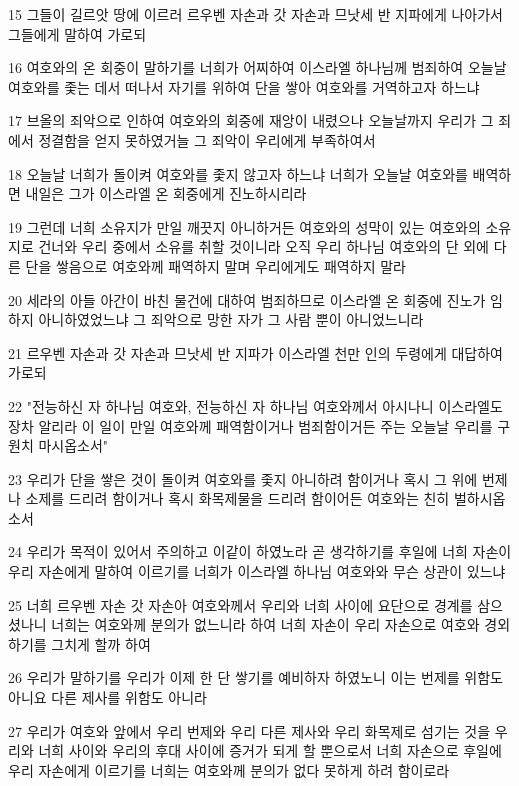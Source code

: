 \par 15 그들이 길르앗 땅에 이르러 르우벤 자손과 갓 자손과 므낫세 반 지파에게 나아가서 그들에게 말하여 가로되
\par 16 여호와의 온 회중이 말하기를 너희가 어찌하여 이스라엘 하나님께 범죄하여 오늘날 여호와를 좇는 데서 떠나서 자기를 위하여 단을 쌓아 여호와를 거역하고자 하느냐
\par 17 브올의 죄악으로 인하여 여호와의 회중에 재앙이 내렸으나 오늘날까지 우리가 그 죄에서 정결함을 얻지 못하였거늘 그 죄악이 우리에게 부족하여서
\par 18 오늘날 너희가 돌이켜 여호와를 좇지 않고자 하느냐 너희가 오늘날 여호와를 배역하면 내일은 그가 이스라엘 온 회중에게 진노하시리라
\par 19 그런데 너희 소유지가 만일 깨끗지 아니하거든 여호와의 성막이 있는 여호와의 소유지로 건너와 우리 중에서 소유를 취할 것이니라 오직 우리 하나님 여호와의 단 외에 다른 단을 쌓음으로 여호와께 패역하지 말며 우리에게도 패역하지 말라
\par 20 세라의 아들 아간이 바친 물건에 대하여 범죄하므로 이스라엘 온 회중에 진노가 임하지 아니하였었느냐 그 죄악으로 망한 자가 그 사람 뿐이 아니었느니라
\par 21 르우벤 자손과 갓 자손과 므낫세 반 지파가 이스라엘 천만 인의 두령에게 대답하여 가로되
\par 22 "전능하신 자 하나님 여호와, 전능하신 자 하나님 여호와께서 아시나니 이스라엘도 장차 알리라 이 일이 만일 여호와께 패역함이거나 범죄함이거든 주는 오늘날 우리를 구원치 마시옵소서"
\par 23 우리가 단을 쌓은 것이 돌이켜 여호와를 좇지 아니하려 함이거나 혹시 그 위에 번제나 소제를 드리려 함이거나 혹시 화목제물을 드리려 함이어든 여호와는 친히 벌하시옵소서
\par 24 우리가 목적이 있어서 주의하고 이같이 하였노라 곧 생각하기를 후일에 너희 자손이 우리 자손에게 말하여 이르기를 너희가 이스라엘 하나님 여호와와 무슨 상관이 있느냐
\par 25 너희 르우벤 자손 갓 자손아 여호와께서 우리와 너희 사이에 요단으로 경계를 삼으셨나니 너희는 여호와께 분의가 없느니라 하여 너희 자손이 우리 자손으로 여호와 경외하기를 그치게 할까 하여
\par 26 우리가 말하기를 우리가 이제 한 단 쌓기를 예비하자 하였노니 이는 번제를 위함도 아니요 다른 제사를 위함도 아니라
\par 27 우리가 여호와 앞에서 우리 번제와 우리 다른 제사와 우리 화목제로 섬기는 것을 우리와 너희 사이와 우리의 후대 사이에 증거가 되게 할 뿐으로서 너희 자손으로 후일에 우리 자손에게 이르기를 너희는 여호와께 분의가 없다 못하게 하려 함이로라
